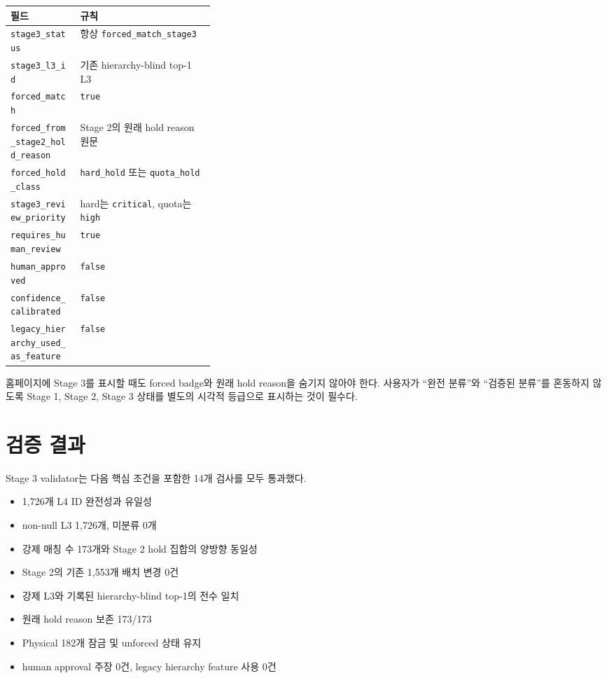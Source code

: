 \documentclass[11pt,a4paper]{article}
\newcommand{\code}[1]{\texttt{#1}}
\begin{document}
\begin{longtable}{p{0.34\linewidth}Y}
\toprule
필드 & 규칙 \\
\midrule
\endhead
\code{stage3\_status} & 항상 \code{forced\_match\_stage3} \\
\code{stage3\_l3\_id} & 기존 hierarchy-blind top-1 L3 \\
\code{forced\_match} & \code{true} \\
\code{forced\_from\_stage2\_hold\_reason} & Stage 2의 원래 hold reason 원문 \\
\code{forced\_hold\_class} & \code{hard\_hold} 또는 \code{quota\_hold} \\
\code{stage3\_review\_priority} & hard는 \code{critical}, quota는 \code{high} \\
\code{requires\_human\_review} & \code{true} \\
\code{human\_approved} & \code{false} \\
\code{confidence\_calibrated} & \code{false} \\
\code{legacy\_hierarchy\_used\_as\_feature} & \code{false} \\
\bottomrule
\end{longtable}

홈페이지에 Stage 3를 표시할 때도 forced badge와 원래 hold reason을 숨기지 않아야 한다.
사용자가 ``완전 분류''와 ``검증된 분류''를 혼동하지 않도록 Stage 1, Stage 2, Stage 3
상태를 별도의 시각적 등급으로 표시하는 것이 필수다.

\section{검증 결과}

Stage 3 validator는 다음 핵심 조건을 포함한 14개 검사를 모두 통과했다.

\begin{itemize}[leftmargin=2em]
  \item 1,726개 L4 ID 완전성과 유일성
  \item non-null L3 1,726개, 미분류 0개
  \item 강제 매칭 수 173개와 Stage 2 hold 집합의 양방향 동일성
  \item Stage 2의 기존 1,553개 배치 변경 0건
  \item 강제 L3와 기록된 hierarchy-blind top-1의 전수 일치
  \item 원래 hold reason 보존 173/173
  \item Physical 182개 잠금 및 unforced 상태 유지
  \item human approval 주장 0건, legacy hierarchy feature 사용 0건
\end{itemize}
\end{document}
